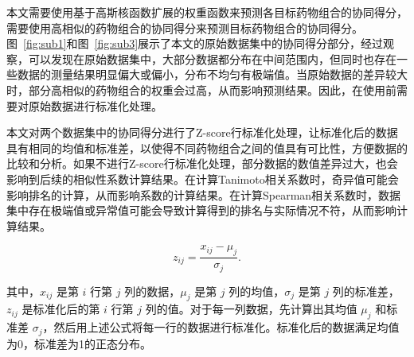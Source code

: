 本文需要使用基于高斯核函数扩展的权重函数来预测各目标药物组合的协同得分，需要使用高相似的药物组合的协同得分来预测目标药物组合的协同得分。图~\ref{fig:sub1}和图~\ref{fig:sub3}展示了本文的原始数据集中的协同得分部分，经过观察，可以发现在原始数据集中，大部分数据都分布在中间范围内，但同时也存在一些数据的测量结果明显偏大或偏小，分布不均匀有极端值。当原始数据的差异较大时，部分高相似的药物组合的权重会过高，从而影响预测结果。因此，在使用前需要对原始数据进行标准化处理\supercite{20}。

本文对两个数据集中的协同得分进行了Z-score行标准化处理，让标准化后的数据具有相同的均值和标准差，以使得不同药物组合之间的值具有可比性，方便数据的比较和分析。如果不进行Z-score行标准化处理，部分数据的数值差异过大，也会影响到后续的相似性系数计算结果。在计算Tanimoto相关系数时，奇异值可能会影响排名的计算，从而影响系数的计算结果。在计算Spearman相关系数时，数据集中存在极端值或异常值可能会导致计算得到的排名与实际情况不符，从而影响计算结果。

\begin{equation}
z_{ij} = \frac{x_{ij} - \mu_j}{\sigma_j}.
\end{equation}

\noindent 其中，$x_{ij}$ 是第 $i$ 行第 $j$ 列的数据，$\mu_j$ 是第 $j$ 列的均值，$\sigma_j$ 是第 $j$ 列的标准差，$z_{ij}$ 是标准化后的第 $i$ 行第 $j$ 列的值。对于每一列数据，先计算出其均值 $\mu_j$ 和标准差 $\sigma_j$，然后用上述公式将每一行的数据进行标准化。标准化后的数据满足均值为0，标准差为1的正态分布。

\newpage

